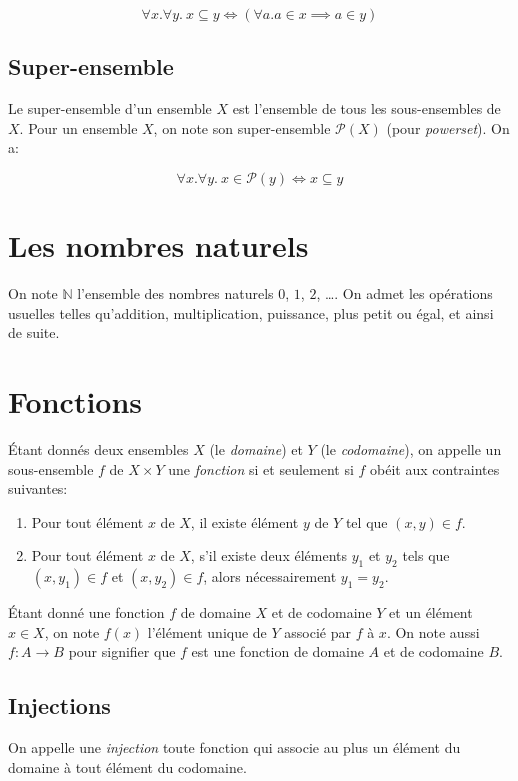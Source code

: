 \[
\forall x. \forall y.\ x \subseteq y \iff (\forall a. a \in x \implies a \in y)
\]

\subsection{Super-ensemble}

Le super-ensemble d'un ensemble $X$ est l'ensemble de tous les sous-ensembles de $X$.
Pour un ensemble $X$, on note son super-ensemble $\mathcal{P}(X)$ (pour \textit{powerset}).
On a:

\[
\forall x. \forall y.\ x \in \mathcal{P}(y) \iff x \subseteq y
\]

\section{Les nombres naturels}

On note $\mathbb{N}$ l'ensemble des nombres naturels $0$, $1$, $2$, \dots.
On admet les opérations usuelles telles qu'addition, multiplication, puissance, plus petit ou égal, et ainsi de suite.

\section{Fonctions}

Étant donnés deux ensembles $X$ (le \textit{domaine}) et $Y$ (le \textit{codomaine}), on appelle un sous-ensemble $f$ de $X \times Y$ une \og \textit{fonction} \fg{} si et seulement si $f$ obéit aux contraintes suivantes:
\begin{enumerate}
\item Pour tout élément $x$ de $X$, il existe élément $y$ de $Y$ tel que $(x, y) \in f$.
\item Pour tout élément $x$ de $X$, s'il existe deux éléments $y_1$ et $y_2$ tels que $(x, y_1) \in f$ et $(x, y_2) \in f$, alors nécessairement $y_1 = y_2$.
\end{enumerate}
Étant donné une fonction $f$ de domaine $X$ et de codomaine $Y$ et un élément $x \in X$, on note $f(x)$ l'élément unique de $Y$ associé par $f$ à $x$.
On note aussi $f : A \to B$ pour signifier que $f$ est une fonction de domaine $A$ et de codomaine $B$.

\subsection{Injections}

On appelle une \og \textit{injection} \fg{} toute fonction qui associe au plus un élément du domaine à tout élément du codomaine.

